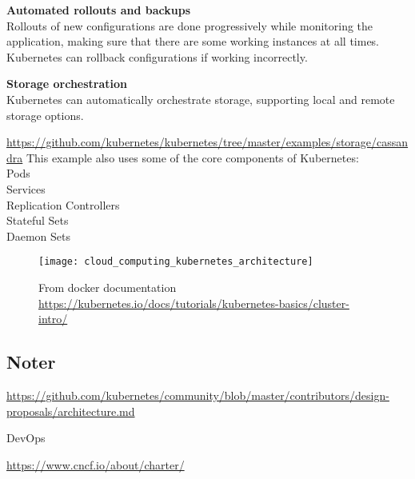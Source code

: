 \textbf{Automated rollouts and backups}\\
Rollouts of new configurations are done progressively while monitoring the application, making sure that there are some working instances at all times. Kubernetes can rollback configurations if working incorrectly.

\textbf{Storage orchestration}\\
Kubernetes can automatically orchestrate storage, supporting local and remote storage options.


\url{https://github.com/kubernetes/kubernetes/tree/master/examples/storage/cassandra}  
This example also uses some of the core components of Kubernetes:\\
Pods\\
Services\\
Replication Controllers\\
Stateful Sets\\
Daemon Sets\\

\begin{figure}[!htb]
	\centering 
		 \texttt{[image: cloud\_computing\_kubernetes\_architecture]}
	  \caption{From docker documentation \url{https://kubernetes.io/docs/tutorials/kubernetes-basics/cluster-intro/}}
  \label{fig:cloud_computing_kubernetes_architecture}
\end{figure}

\subsection*{Noter}
\url{https://github.com/kubernetes/community/blob/master/contributors/design-proposals/architecture.md}

DevOps

\url{https://www.cncf.io/about/charter/}


%
%